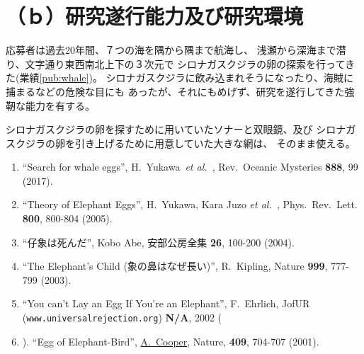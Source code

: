 \documentclass[11pt,a4j,dvipdfmx]{jarticle} 					%
\newcommand{\研究課題名}{象の卵}
\newcommand{\研究機関名}{逢坂大学}
\newcommand{\研究代表者氏名}{湯川秀樹}
\newcommand{\研究期間の最終元号年度}{8}  %
\newcommand{\paper}[6]{%
	\item ``#1'', #2, #3 {\bf #4}, #5 (#6).			%
}
\newcommand{\etal}{\textit{et al.\ }}
\newcommand{\yukawa}{H.~Yukawa}					%
\newcommand{\prl}{Phys.\ Rev.\ Lett.\ }		%
\begin{document}



\section{ （ｂ）研究遂行能力及び研究環境}

\PapersInstructions		%
	応募者は過去20年間、７つの海を隅から隅まで航海し、
	浅瀬から深海まで潜り、文字通り東西南北上下の３次元で
	シロナガスクジラの卵の探索を行ってきた(業績\ref{pub:whale})。
	シロナガスクジラに飲み込まれそうになったり、海賊に捕まるなどの危険な目にも
	あったが、それにもめげず、研究を遂行してきた強靭な能力を有する。

	シロナガスクジラの卵を探すために用いていたソナーと双眼鏡、及び
	シロナガスクジラの卵を引き上げるために用意していた大きな網は、
	そのまま使える。
	\begin{enumerate}
		\paper{Search for whale eggs}{\yukawa\ \etal}{Rev.\ Oceanic Mysteries}{888}{99}{2017}
			\label{pub:whale}
				
		\paper{Theory of Elephant Eggs}{\yukawa, Kara Juzo \etal}{\prl}{800}{800-804}{2005}
			\label{pub:theoegg}
				
		\paper{仔象は死んだ}{Kobo Abe}{安部公房全集}{26}{100-200}{2004}
		
		\paper{The Elephant's Child (象の鼻はなぜ長い)}{R.~Kipling}{Nature}{999}{777-799}{2003}

		\paper{You can't Lay an Egg If You're an Elephant}{F.~Ehrlich}
			{JofUR\\({\tt www.universalrejection.org})}{{\bf N/A}}{2002}
		
		\item ``Egg of Elephant-Bird'', 
				\underline{A.~Cooper},
				Nature, {\bf 409}, 704-707 (2001).	%
	\end{enumerate}


\end{document}

